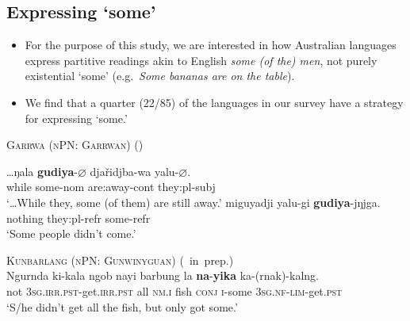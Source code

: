 \documentclass{article}
\makeatletter
\newcommand{\ofy}{/85} %
\makeatother
\begin{document}
\subsection{Expressing `some'}
\begin{itemize}
\item For the purpose of this study, we are interested in how Australian languages express partitive readings akin to English {\it some (of the) men}, not purely existential `some' (e.g.\ {\it Some bananas are on the table}).
\item We find that a quarter (22\ofy) of the languages in our survey have a strategy for expressing `some.'
\end{itemize}


\begin{exe}
  \ex \textsc{Garrwa (nPN: Garrwan)} (\citealt[19,37]{furby77})
  \begin{xlist}
    \ex \gll \ldots{}ŋala     \textbf{gudiya}-$\varnothing$    dja\v{r}idjba-wa    yalu-$\varnothing.$\\
    \phantom{\ldots}while     some-{\sc nom}    are:away-{\sc cont}    they:{\sc pl-subj}\\
    \glt   `\ldots{}While they, some (of them) are still away.'
    \ex  \gll  miguyadji    yalu-gi    \textbf{gudiya}-jŋjga. \\
    nothing    they:{\sc pl-refr}    some-{\sc refr} \\
    \glt   `Some people didn’t come.'
  \end{xlist}

  \ex \textsc{Kunbarlang (nPN: Gunwinyguan)} (\citealt{ikthesis}~in~prep.)\\
  \gll Ngurnda ki-kala ngob nayi barbung la \textbf{na}-\textbf{yika} ka-(rnak)-kalng.\\
  not \textsc{3sg.irr.pst}-get.\textsc{irr.pst} all \textsc{nm.i} fish \textsc{conj} \textsc{i}-some \textsc{3sg.nf}-\textsc{lim}-get.\textsc{pst}\\
  \glt `S/he didn't get all the fish, but only got some.' %
  
\end{exe}
\end{document}
